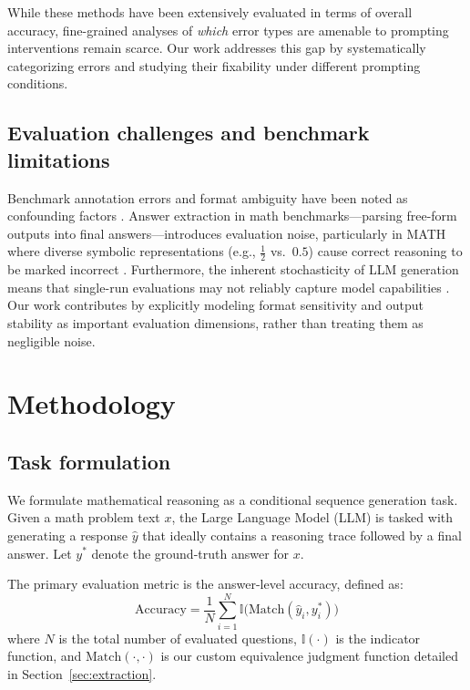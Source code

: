 \documentclass{article}
\begin{document}
While these methods have been extensively evaluated in terms of overall accuracy, fine-grained analyses of \textit{which} error types are amenable to prompting interventions remain scarce. Our work addresses this gap by systematically categorizing errors and studying their fixability under different prompting conditions.

\subsection{Evaluation challenges and benchmark limitations}
Benchmark annotation errors and format ambiguity have been noted as confounding factors \cite{kismath2024, prolog2024, jo2025finding}. Answer extraction in math benchmarks---parsing free-form outputs into final answers---introduces evaluation noise, particularly in MATH where diverse symbolic representations (e.g., $\frac{1}{2}$ vs.\ $0.5$) cause correct reasoning to be marked incorrect \cite{jo2025finding, hendrycks2021measuring}. Furthermore, the inherent stochasticity of LLM generation means that single-run evaluations may not reliably capture model capabilities \cite{potamitis2025reasonbench, atil2025nondeterminism}. Our work contributes by explicitly modeling format sensitivity and output stability as important evaluation dimensions, rather than treating them as negligible noise.

\section{Methodology}

\subsection{Task formulation}
We formulate mathematical reasoning as a conditional sequence generation task. Given a math problem text $x$, the Large Language Model (LLM) is tasked with generating a response $\hat{y}$ that ideally contains a  reasoning trace followed by a final answer. Let $y^*$ denote the ground-truth answer for $x$. 

The primary evaluation metric is the answer-level accuracy, defined as:
\begin{equation}
    \text{Accuracy} = \frac{1}{N} \sum_{i=1}^{N} \mathbb{I}\big(\text{Match}(\hat{y}_i, y^*_i)\big)
\end{equation}
where $N$ is the total number of evaluated questions, $\mathbb{I}(\cdot)$ is the indicator function, and $\text{Match}(\cdot, \cdot)$ is our custom equivalence judgment function detailed in Section~\ref{sec:extraction}.
\end{document}
